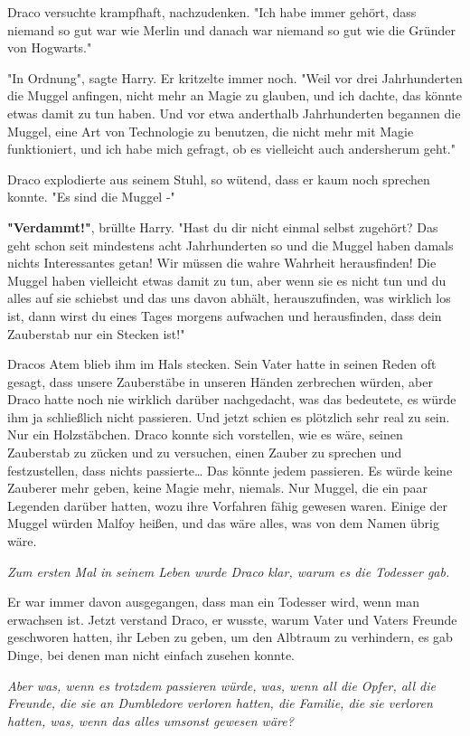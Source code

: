 {Draco versuchte krampfhaft, nachzudenken. "Ich habe immer gehört, dass niemand so gut war wie Merlin und danach war niemand so gut wie die Gründer von Hogwarts."

"In Ordnung", sagte Harry. Er kritzelte immer noch. "Weil vor drei Jahrhunderten die Muggel anfingen, nicht mehr an Magie zu glauben, und ich dachte, das könnte etwas damit zu tun haben. Und vor etwa anderthalb Jahrhunderten begannen die Muggel, eine Art von Technologie zu benutzen, die nicht mehr mit Magie funktioniert, und ich habe mich gefragt, ob es vielleicht auch andersherum geht."

Draco explodierte aus seinem Stuhl, so wütend, dass er kaum noch sprechen konnte. "Es sind die Muggel -"

\textbf{"Verdammt!"}, brüllte Harry. "Hast du dir nicht einmal selbst zugehört? Das geht schon seit mindestens acht Jahrhunderten so und die Muggel haben damals nichts Interessantes getan! Wir müssen die wahre Wahrheit herausfinden! Die Muggel haben vielleicht etwas damit zu tun, aber wenn sie es nicht tun und du alles auf sie schiebst und das uns davon abhält, herauszufinden, was wirklich los ist, dann wirst du eines Tages morgens aufwachen und herausfinden, dass dein Zauberstab nur ein Stecken ist!"

Dracos Atem blieb ihm im Hals stecken. Sein Vater hatte in seinen Reden oft gesagt, dass unsere Zauberstäbe in unseren Händen zerbrechen würden, aber Draco hatte noch nie wirklich darüber nachgedacht, was das bedeutete, es würde ihm ja schließlich nicht passieren. Und jetzt schien es plötzlich sehr real zu sein. Nur ein Holzstäbchen. Draco konnte sich vorstellen, wie es wäre, seinen Zauberstab zu zücken und zu versuchen, einen Zauber zu sprechen und festzustellen, dass nichts passierte… Das könnte jedem passieren. Es würde keine Zauberer mehr geben, keine Magie mehr, niemals. Nur Muggel, die ein paar Legenden darüber hatten, wozu ihre Vorfahren fähig gewesen waren. Einige der Muggel würden Malfoy heißen, und das wäre alles, was von dem Namen übrig wäre.

\emph{Zum ersten Mal in seinem Leben wurde Draco klar, warum es die Todesser gab.}

Er war immer davon ausgegangen, dass man ein Todesser wird, wenn man erwachsen ist. Jetzt verstand Draco, er wusste, warum Vater und Vaters Freunde geschworen hatten, ihr Leben zu geben, um den Albtraum zu verhindern, es gab Dinge, bei denen man nicht einfach zusehen konnte.

\emph{Aber was, wenn es trotzdem passieren würde, was, wenn all die Opfer, all die Freunde, die sie an Dumbledore verloren hatten, die Familie, die sie verloren hatten, was, wenn das alles umsonst gewesen wäre?}

}
